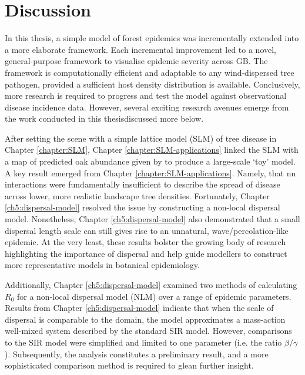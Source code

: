 
\chapter{Discussion}

In this thesis, a simple model of forest epidemics was incrementally extended into a more elaborate framework.
Each incremental improvement led to a novel, general-purpose framework to visualise epidemic severity across GB.
The framework is computationally efficient and adaptable to any wind-dispersed tree pathogen, provided a sufficient host density distribution is available. Conclusively, more research is required to progress and test the model against observational disease incidence data.
However, several exciting research avenues emerge from the work conducted in this thesis\textemdash discussed more below.

After setting the scene with a simple lattice model (SLM) of tree disease in Chapter \ref{chapter:SLM}, 
Chapter \ref{chapter:SLM-applications} linked the SLM with a map of predicted oak abundance given by \cite{hill.data} to produce a large-scale `toy' model. 
A key result emerged from Chapter \ref{chapter:SLM-applications}.
Namely, that \acrshort{nn} interactions were fundamentally insufficient to describe the spread of disease across lower, more realistic landscape tree densities. 
Fortunately, Chapter \ref{ch5:dispersal-model} resolved the issue by constructing a non-local dispersal model.
Nonetheless, Chapter \ref{ch5:dispersal-model} also demonstrated that a small dispersal length scale can still gives rise to an unnatural, wave/percolation-like epidemic. 
At the very least, these results bolster the growing body of research highlighting the importance of dispersal and help guide modellers to construct more representative models in botanical epidemiology.

Additionally, Chapter \ref{ch5:dispersal-model} examined two methods of calculating $R_0$ for a non-local dispersal model (NLM) over a range of epidemic parameters. Results from Chapter \ref{ch5:dispersal-model} indicate that when the scale of dispersal is comparable to the domain, the model approximates a mass-action well-mixed system described by the standard SIR model. However, comparisons to the SIR model were simplified and limited to one parameter (i.e. the ratio $\beta/\gamma$). Subsequently, the analysis constitutes a preliminary result, and a more sophisticated comparison method is required to glean further insight.

